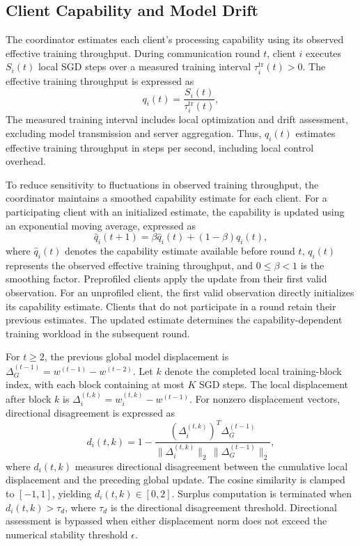 \documentclass[conference]{IEEEtran}
\begin{document}
\subsection{Client Capability and Model Drift}
\label{subsec:state}
The coordinator estimates each client's processing capability using its observed effective training throughput. During communication round $t$, client $i$ executes $S_i(t)$ local SGD steps over a measured training interval
$\tau_i^{\mathrm{tr}}(t)>0$. The effective training throughput is expressed as
\begin{equation}
q_i(t)=
\frac{S_i(t)}{\tau_i^{\mathrm{tr}}(t)},
\label{eq:throughput}
\end{equation}
The measured training interval includes local optimization and drift assessment, excluding model transmission and server aggregation. Thus, $q_i(t)$ estimates effective training throughput in steps per second, including local control overhead.

To reduce sensitivity to fluctuations in observed training throughput, the coordinator maintains a smoothed capability estimate for each client. For a participating client with an initialized estimate, the capability is updated using an exponential moving average, expressed as
\begin{equation}
\widehat q_i(t+1) =
\beta\widehat q_i(t)+(1-\beta)q_i(t),
\label{eq:smoothing}
\end{equation}
where $\widehat q_i(t)$ denotes the capability estimate available before round $t$, $q_i(t)$ represents the observed effective training throughput, and $0\leq\beta<1$ is the smoothing factor.
Preprofiled clients apply the update from their first valid observation. For an unprofiled client, the first valid observation directly initializes its capability estimate.
Clients that do not participate in a round retain their previous estimates. The updated estimate determines the capability-dependent training workload in the subsequent round.

For $t\ge2$, the previous global model
displacement is $\Delta_G^{(t-1)}=w^{(t-1)}-w^{(t-2)}$.
Let $k$ denote the completed local
training-block index, with each block
containing at most $K$ SGD steps.
The local displacement after block $k$ is $\Delta_i^{(t,k)}=w_i^{(t,k)}-w^{(t-1)}$.
For nonzero displacement vectors,
directional disagreement is expressed as
\begin{equation}
d_i(t,k) = 1 -
\frac{\left(\Delta_i^{(t,k)}\right)^T
\Delta_G^{(t-1)}}
{\|\Delta_i^{(t,k)}\|_2\,
\|\Delta_G^{(t-1)}\|_2},
\label{eq:drift}
\end{equation}
where $d_i(t,k)$ measures directional
disagreement between the cumulative local displacement and the preceding global update. The cosine similarity is clamped to $[-1,1]$, yielding $d_i(t,k)\in[0,2]$.
Surplus computation is terminated when
$d_i(t,k)>\tau_d$, where $\tau_d$ is the
directional disagreement threshold.
Directional assessment is bypassed when
either displacement norm does not exceed
the numerical stability threshold $\epsilon$.
\end{document}
